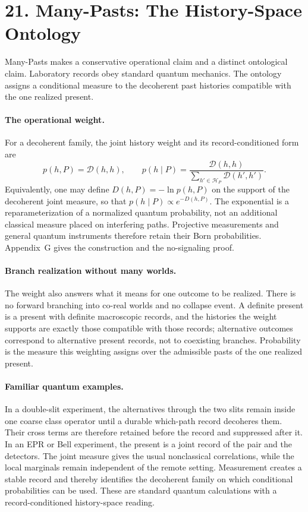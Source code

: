 \documentclass[11pt]{article}
\begin{document}
\section{21. Many-Pasts: The History-Space Ontology}

Many-Pasts makes a conservative operational claim and a distinct ontological claim. Laboratory records obey standard quantum mechanics. The ontology assigns a conditional measure to the decoherent past histories compatible with the one realized present.

\paragraph{The operational weight.}
For a decoherent family, the joint history weight and its record-conditioned form are
\[
p(h,P)=\mathcal D(h,h),
\qquad
p(h\mid P)=\frac{\mathcal D(h,h)}{\sum_{h'\in\mathcal H_P}\mathcal D(h',h')}.
\]
Equivalently, one may define $D(h,P)=-\ln p(h,P)$ on the support of the decoherent joint measure, so that $p(h\mid P)\propto e^{-D(h,P)}$. The exponential is a reparameterization of a normalized quantum probability, not an additional classical measure placed on interfering paths. Projective measurements and general quantum instruments therefore retain their Born probabilities. Appendix~G gives the construction and the no-signaling proof.

\paragraph{Branch realization without many worlds.}
The weight also answers what it means for one outcome to be realized. There is no forward branching into co-real worlds and no collapse event. A definite present is a present with definite macroscopic records, and the histories the weight supports are exactly those compatible with those records; alternative outcomes correspond to alternative present records, not to coexisting branches. Probability is the measure this weighting assigns over the admissible pasts of the one realized present.

\paragraph{Familiar quantum examples.}
In a double-slit experiment, the alternatives through the two slits remain inside one coarse class operator until a durable which-path record decoheres them. Their cross terms are therefore retained before the record and suppressed after it. In an EPR or Bell experiment, the present is a joint record of the pair and the detectors. The joint measure gives the usual nonclassical correlations, while the local marginals remain independent of the remote setting. Measurement creates a stable record and thereby identifies the decoherent family on which conditional probabilities can be used. These are standard quantum calculations with a record-conditioned history-space reading.
\end{document}
